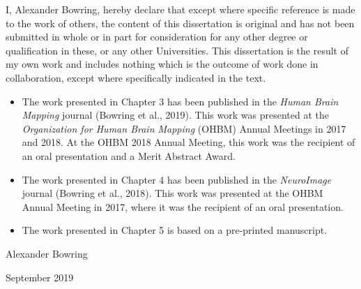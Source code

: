 \documentclass[11pt,a4paper]{report}      %
\begin{document}
\begin{thesisdeclaration}        
I, Alexander Bowring, hereby declare that except where specific reference is made to the work of others, the content of this dissertation is original and has not been submitted in whole or in part for consideration for any other degree or qualification in these, or any other Universities. This dissertation is the result of my own work and includes nothing which is the outcome of work done in collaboration, except where specifically indicated in the text.

\begin{itemize}
\item The work presented in Chapter 3 has been published in the \textit{Human Brain Mapping} journal (Bowring et al., 2019). This work was presented at the \textit{Organization for Human Brain Mapping} (OHBM) Annual Meetings in 2017 and 2018. At the OHBM 2018 Annual Meeting, this work was the recipient of an oral presentation and a Merit Abstract Award. 
 
\item The work presented in Chapter 4 has been published in the \textit{NeuroImage} journal (Bowring et al., 2018). This work was presented at the OHBM Annual Meeting in 2017, where it was the recipient of an oral presentation. 

\item The work presented in Chapter 5 is based on a pre-printed manuscript.
\end{itemize}

\vspace{2cm}
\hspace{-1.2cm}
Alexander Bowring

\hspace{-1.2cm}
September 2019




\end{thesisdeclaration}
\end{document}
